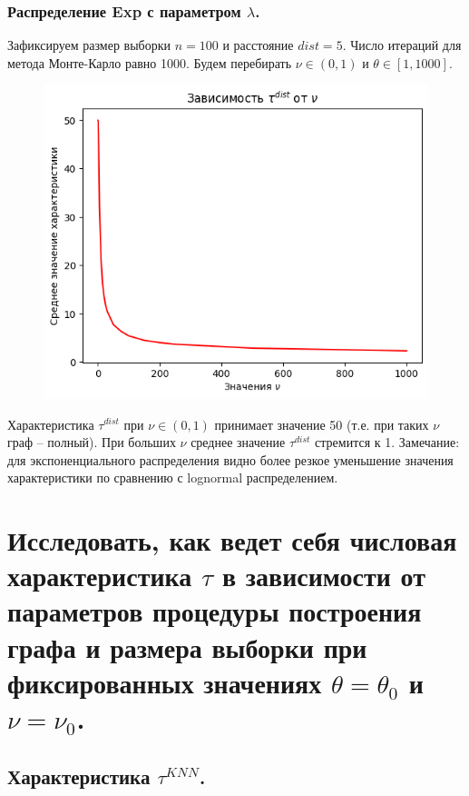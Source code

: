 \documentclass{report}
\begin{document}
\subsection{Распределение Exp с параметром $\lambda$.}
Зафиксируем размер выборки $n = 100$ и расстояние $dist = 5$. Число итераций для метода Монте-Карло равно 1000.
\newline
\newline
Будем перебирать $\nu \in (0, 1)$ и $\theta \in [1, 1000]$.
\newline
\newline
\begin{figure}[h]
    \centering
    \includegraphics[width=0.5\linewidth]{8.png}
\end{figure}
\newline
\newline
Характеристика $\tau^{dist}$ при $\nu \in (0, 1)$ принимает значение 50 (т.е. при таких $\nu$ граф -- полный). 
\newline
\newline
При больших $\nu$ среднее значение $\tau^{dist}$ стремится к 1.
\newline
\newline
Замечание: для экспоненциального распределения видно более резкое уменьшение значения характеристики по сравнению с lognormal распределением.

\chapter{Исследовать, как ведет себя числовая характеристика $\tau$ в зависимости от параметров процедуры построения графа и размера выборки при фиксированных значениях $\theta = \theta_0$ и $\nu = \nu_0$.}
\section{Характеристика $\tau^{KNN}$.}
\end{document}
